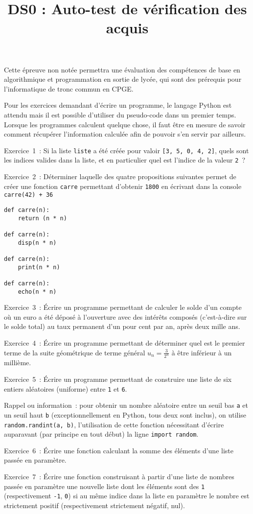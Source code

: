 \documentclass[12pt]{article}
\title{DS0 : Auto-test de vérification des acquis}
\date{\vspace{-8ex}}
\theoremstyle{style}
\newcommand{\exo}[1]{#1}
\begin{document}
\maketitle

Cette épreuve non notée permettra une évaluation des compétences de base en algorithmique et programmation en sortie de lycée, qui sont des prérequis pour l'informatique de tronc commun en CPGE.

Pour les exercices demandant d'écrire un programme, le langage Python est attendu mais il est possible d'utiliser du pseudo-code dans un premier temps. Lorsque les programmes calculent quelque chose, il faut être en mesure de savoir comment récupérer l'information calculée afin de pouvoir s'en servir par ailleurs.

\exo{Exercice~1~: Si la liste \texttt{liste} a été créée pour valoir \texttt{[3, 5, 0, 4, 2]}, quels sont les indices valides dans la liste, et en particulier quel est l'indice de la valeur \texttt{2}~?}

\exo{Exercice~2~: Déterminer laquelle des quatre propositions suivantes permet de créer une fonction \texttt{carre}
permettant d'obtenir \texttt{1800} en écrivant dans la console \texttt{carre(42) + 36}}

\begin{multicols}{4}
\begin{verbatim}
def carre(n):
    return (n * n)

def carre(n):
    disp(n * n)

def carre(n):
    print(n * n)

def carre(n):
    echo(n * n)
\end{verbatim}
\end{multicols}

\exo{Exercice~3~: Écrire un programme permettant de calculer le solde d'un compte où un euro a été déposé à l'ouverture avec des intérêts composés (c'est-à-dire sur le solde total) au taux permanent d'un pour cent par an, après deux mille ans.}

\exo{Exercice~4~: Écrire un programme permettant de déterminer quel est le premier terme de la suite géométrique de terme général $u_n = \frac{3}{2^n}$ à être inférieur à un millième.}

\exo{Exercice~5~: Écrire un programme permettant de construire une liste de six entiers aléatoires (uniforme) entre \texttt{1} et \texttt{6}.}

Rappel ou information~: pour obtenir un nombre aléatoire entre un seuil bas \texttt{a} et un seuil haut \texttt{b} (exceptionnellement en Python, tous deux sont inclus), on utilise \texttt{random.randint(a, b)},
l'utilisation de cette fonction nécessitant d'écrire auparavant (par principe en tout début) la ligne \texttt{import random}.

\exo{Exercice~6~: Écrire une fonction calculant la somme des éléments d'une liste passée en paramètre.}

\exo{Exercice~7~: Écrire une fonction construisant à partir d'une liste de nombres passée en paramètre une nouvelle liste dont les éléments sont des \texttt{1} (respectivement \texttt{-1}, \texttt{0}) si au même indice dans la liste en paramètre le nombre est strictement positif (respectivement strictement négatif, nul).}
\end{document}
